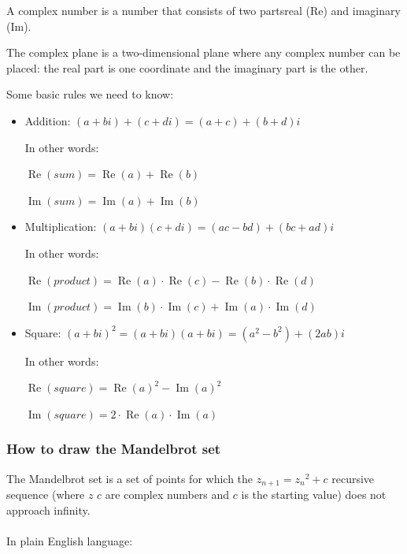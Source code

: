 A complex number is a number that consists of two parts\EMDASH{}real (Re) and imaginary (Im).


The complex plane is a two-dimensional plane where any complex number can be placed: the real part is one coordinate
and the imaginary part is the other.

Some basic rules we need to know:

\begin{itemize}
\item Addition: $(a+bi) + (c+di) = (a+c) + (b+d)i$

In other words:

$\operatorname{Re}(sum) = \operatorname{Re}(a) + \operatorname{Re}(b)$

$\operatorname{Im}(sum) = \operatorname{Im}(a) + \operatorname{Im}(b)$

\item Multiplication: $(a+bi) (c+di) = (ac-bd) + (bc+ad)i$

In other words:

$\operatorname{Re}(product) = \operatorname{Re}(a) \cdot \operatorname{Re}(c) - \operatorname{Re}(b) \cdot \operatorname{Re}(d)$

$\operatorname{Im}(product) = \operatorname{Im}(b) \cdot \operatorname{Im}(c) + \operatorname{Im}(a) \cdot \operatorname{Im}(d)$

\item Square: $(a+bi)^2 = (a+bi) (a+bi) = (a^2-b^2) + (2ab)i$

In other words:

$\operatorname{Re}(square) = \operatorname{Re}(a)^2-\operatorname{Im}(a)^2$

$\operatorname{Im}(square) = 2 \cdot \operatorname{Re}(a) \cdot \operatorname{Im}(a)$

\end{itemize}

\subsubsection{How to draw the Mandelbrot set}


The Mandelbrot set is a set of points for which the $z_{n+1} = {z_n}^2 + c$ recursive sequence
(where $z$ \AndENRU $c$ are complex numbers and $c$ 
is the starting value)
does not approach infinity.\\
\\
In plain English language: 

